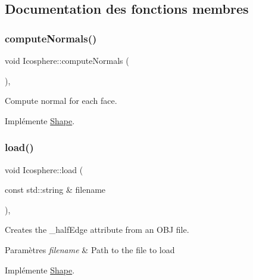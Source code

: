 \subsection{Documentation des fonctions membres}
\mbox{\label{class_icosphere_af7d6c8c60248794f6a6c382dc5f98a24}} 
\subsubsection{\texorpdfstring{compute\+Normals()}{computeNormals()}}
{\footnotesize\ttfamily void Icosphere\+::compute\+Normals (\begin{DoxyParamCaption}{ }\end{DoxyParamCaption})\hspace{0.3cm}{\ttfamily [override]}, {\ttfamily [virtual]}}



Compute normal for each face. 



Implémente \hyperlink{class_shape_afd886ad433d08a566003073bfd837f40}{Shape}.

\mbox{\label{class_icosphere_a72c3cc3d95cf508a623fe336cbbab350}} 
\subsubsection{\texorpdfstring{load()}{load()}}
{\footnotesize\ttfamily void Icosphere\+::load (\begin{DoxyParamCaption}\item[{const std\+::string \&}]{filename }\end{DoxyParamCaption})\hspace{0.3cm}{\ttfamily [override]}, {\ttfamily [virtual]}}



Creates the \+\_\+half\+Edge attribute from an O\+BJ file. 


\begin{DoxyParams}{Paramètres}
{\em filename} & Path to the file to load \\
\hline
\end{DoxyParams}


Implémente \hyperlink{class_shape_a20d654ec232b682c36cd8b28d2cba750}{Shape}.

